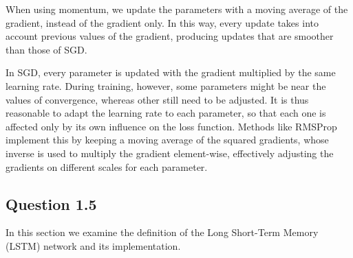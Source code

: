 \documentclass{article}
\begin{document}
When using momentum, we update the parameters with a moving average of the gradient, instead of the gradient only. In this way, every update takes into account previous values of the gradient, producing updates that are smoother than those of SGD.

In SGD, every parameter is updated with the gradient multiplied by the same learning rate. During training, however, some parameters might be near the values of convergence, whereas other still need to be adjusted. It is thus reasonable to adapt the learning rate to each parameter, so that each one is affected only by its own influence on the loss function. Methods like RMSProp implement this by keeping a moving average of the squared gradients, whose inverse is used to multiply the gradient element-wise, effectively adjusting the gradients on different scales for each parameter.

\subsection*{Question 1.5}

In this section we examine the definition of the Long Short-Term Memory (LSTM) network \cite{hochreiter1997lstm} and its implementation.
\end{document}
